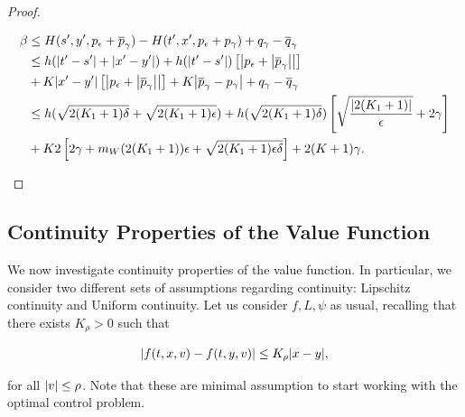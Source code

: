 \begin{proof}
\begin{enumerate}[label=\arabic*')]
       \begin{align*}
       \beta&\leq H(s',y',p_{\epsilon}+\overline{p}_{\gamma}) - H(t',x',p_{\epsilon}+p_{\gamma}) + q_{\gamma} - \overline{q}_{\gamma} \\
       & \leq h(\abs{t'-s'}+\abs{x'-y'})+h(\abs{t'-s'})\left[\abs{p_{\epsilon}+\abs{\overline{p}_{\gamma}}}\right] \\
       & + K\abs{x'-y'}\left[\abs{p_{\epsilon}+\abs{\overline{p}_{\gamma}}}\right]+K\abs{\overline{p}_{\gamma}-p_{\gamma}}+q_{\gamma}-\overline{q}_{\gamma} \\
       & \leq h(\sqrt{2(K_1+1)\delta}+\sqrt{2(K_1+1)\epsilon})+h(\sqrt{2(K_1+1)\delta})\left[\sqrt{\frac{\abs{2(K_1+1)}}{\epsilon}}+2\gamma\right] \\
       & + K2\left[2\gamma+m_W(2(K_1+1))\epsilon+\sqrt{2(K_1+1)\epsilon\delta}\right]+2(K+1)\gamma.
       \end{align*}
    \end{enumerate}
\end{proof}

\subsection{Continuity Properties of the Value Function}

We now investigate continuity properties of the value function. In particular, we consider two different sets of assumptions regarding continuity: Lipschitz continuity and Uniform continuity. Let us consider $f,L,\psi$ as usual, recalling that there exists $K_{\rho}>0$ such that 

\begin{equation}\label{4-3-boundonf}
    \abs{f(t,x,v) - f(t,y,v)} \leq K_{\rho}\abs{x-y}, 
\end{equation}

for all $\abs{v}\leq\rho$. Note that these are minimal assumption to start working with the optimal control problem.

